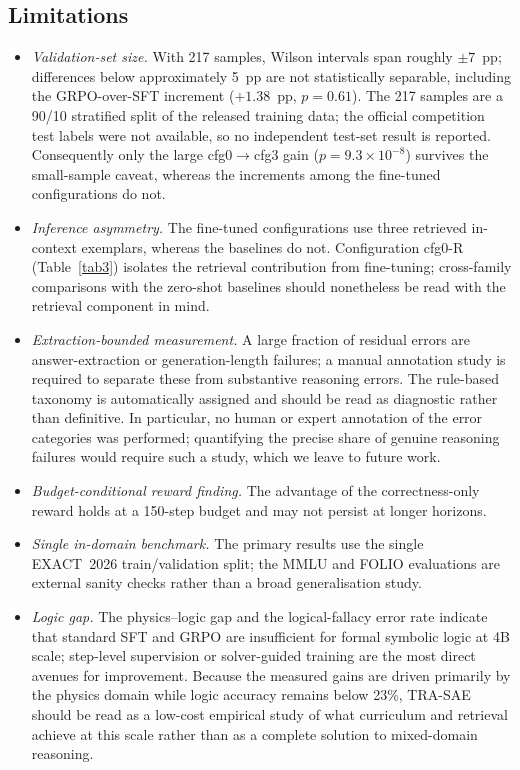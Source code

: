 \documentclass[APA,twocolumn]{USG}
\newcommand{\modelname}{TRA-SAE}
\newcommand{\dataset}{EXACT~2026}
\begin{document}
\subsection{Limitations}
\begin{itemize}
\item \textit{Validation-set size.} With 217 samples, Wilson intervals span
roughly $\pm7$~pp; differences below approximately 5~pp are not statistically
separable, including the GRPO-over-SFT increment ($+1.38$~pp, $p=0.61$). The 217
samples are a 90/10 stratified split of the released training data; the official
competition test labels were not available, so no independent test-set result is
reported. Consequently only the large cfg0$\rightarrow$cfg3 gain
($p=9.3\times10^{-8}$) survives the small-sample caveat, whereas the increments
among the fine-tuned configurations do not.
\item \textit{Inference asymmetry.} The fine-tuned configurations use three
retrieved in-context exemplars, whereas the baselines do not. Configuration
cfg0-R (Table~\ref{tab3}) isolates the retrieval contribution from fine-tuning;
cross-family comparisons with the zero-shot baselines should nonetheless be read
with the retrieval component in mind.
\item \textit{Extraction-bounded measurement.} A large fraction of residual
errors are answer-extraction or generation-length failures; a manual annotation
study is required to separate these from substantive reasoning errors. The
rule-based taxonomy is automatically assigned and should be read as diagnostic
rather than definitive. In particular, no human or expert annotation of the error
categories was performed; quantifying the precise share of genuine reasoning
failures would require such a study, which we leave to future work.
\item \textit{Budget-conditional reward finding.} The advantage of the
correctness-only reward holds at a 150-step budget and may not persist at longer
horizons.
\item \textit{Single in-domain benchmark.} The primary results use the single
\dataset{} train/validation split; the MMLU and FOLIO evaluations are external
sanity checks rather than a broad generalisation study.
\item \textit{Logic gap.} The physics--logic gap and the logical-fallacy error
rate indicate that standard SFT and GRPO are insufficient for formal symbolic
logic at 4B scale; step-level supervision
\citep{Lightman2023,Wang2024mathshepherd} or solver-guided training are the most
direct avenues for improvement. Because the measured gains are driven primarily
by the physics domain while logic accuracy remains below 23\%, \modelname{}
should be read as a low-cost empirical study of what curriculum and retrieval
achieve at this scale rather than as a complete solution to mixed-domain
reasoning.
\end{itemize}
\end{document}
